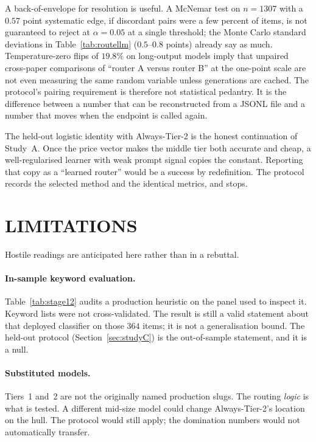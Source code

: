 \documentclass[a4paper,twoside]{article}
\begin{document}
A back-of-envelope for resolution is useful. A McNemar test on $n=1307$ with a $0.57$ point systematic edge, if discordant pairs were a few percent of items, is not guaranteed to reject at $\alpha=0.05$ at a single threshold; the Monte Carlo standard deviations in Table~\ref{tab:routellm} ($0.5$--$0.8$ points) already say as much. Temperature-zero flips of $19.8\%$ on long-output models imply that unpaired cross-paper comparisons of ``router A versus router B'' at the one-point scale are not even measuring the same random variable unless generations are cached. The protocol's pairing requirement is therefore not statistical pedantry. It is the difference between a number that can be reconstructed from a JSONL file and a number that moves when the endpoint is called again.

The held-out logistic identity with Always-Tier-2 is the honest continuation of Study~A. Once the price vector makes the middle tier both accurate and cheap, a well-regularised learner with weak prompt signal copies the constant. Reporting that copy as a ``learned router'' would be a success by redefinition. The protocol records the selected method and the identical metrics, and stops.

\section{\uppercase{Limitations}}

Hostile readings are anticipated here rather than in a rebuttal.

\paragraph{In-sample keyword evaluation.}
Table~\ref{tab:stage12} audits a production heuristic on the panel used to inspect it. Keyword lists were not cross-validated. The result is still a valid statement about that deployed classifier on those $364$ items; it is not a generalisation bound. The held-out protocol (Section~\ref{sec:studyC}) is the out-of-sample statement, and it is a null.

\paragraph{Substituted models.}
Tiers~1 and~2 are not the originally named production slugs. The routing \emph{logic} is what is tested. A different mid-size model could change Always-Tier-2's location on the hull. The protocol would still apply; the domination numbers would not automatically transfer.
\end{document}
